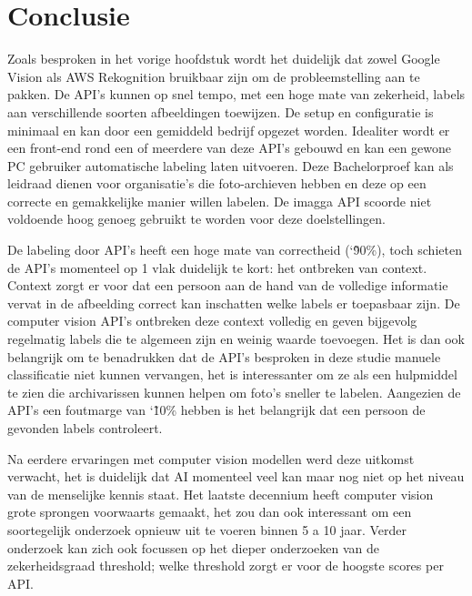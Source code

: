 
\chapter{Conclusie}
\label{ch:conclusie}


Zoals besproken in het vorige hoofdstuk wordt het duidelijk dat zowel Google Vision als AWS Rekognition bruikbaar zijn om de probleemstelling aan te pakken. De API's kunnen op snel tempo, met een hoge mate van zekerheid, labels aan verschillende soorten afbeeldingen toewijzen. De setup en configuratie is minimaal en kan door een gemiddeld bedrijf opgezet worden. Idealiter wordt er een front-end rond een of meerdere van deze API's gebouwd en kan een gewone PC gebruiker automatische labeling laten uitvoeren. Deze Bachelorproef kan als leidraad dienen voor organisatie's die foto-archieven hebben en deze op een correcte en gemakkelijke manier willen labelen. 
De imagga API scoorde niet voldoende hoog genoeg gebruikt te worden voor deze doelstellingen.

De labeling door API's heeft een hoge mate van correctheid (\char`\~ 90\%), toch schieten de API's momenteel op 1 vlak duidelijk te kort: het ontbreken van context. Context zorgt er voor dat een persoon aan de hand van de volledige informatie vervat in de afbeelding correct kan inschatten welke labels er toepasbaar zijn. De computer vision API's ontbreken deze context volledig en geven bijgevolg regelmatig labels die te algemeen zijn en weinig waarde toevoegen. Het is dan ook belangrijk om te benadrukken dat de API's besproken in deze studie manuele classificatie niet kunnen vervangen, het is interessanter om ze als een hulpmiddel te zien die archivarissen kunnen helpen om foto's sneller te labelen. Aangezien de API's een foutmarge van \char`\~ 10\% hebben is het belangrijk dat een persoon de gevonden labels controleert.

Na eerdere ervaringen met computer vision modellen werd deze uitkomst verwacht, het is duidelijk dat AI momenteel veel kan maar nog niet op het niveau van de menselijke kennis staat. Het laatste decennium heeft computer vision grote sprongen voorwaarts gemaakt, het zou dan ook interessant om een soortegelijk onderzoek opnieuw uit te voeren binnen 5 a 10 jaar. Verder onderzoek kan zich ook focussen op het dieper onderzoeken van de zekerheidsgraad threshold; welke threshold zorgt er voor de hoogste scores per API.